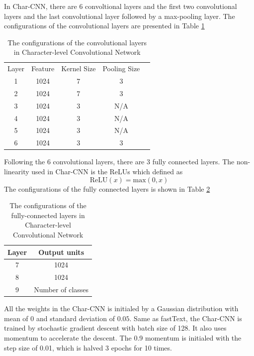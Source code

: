 In Char-CNN, there are 6 convoltional layers and the first two convolutional layers and the last convolutional layer followed by a max-pooling layer. The configurations of the convolutional layers are presented in Table \ref{config_char_cnn}

\begin{table}[]
\caption{The configurations of the convolutional layers in Character-level Convolutional Network}
\centering
\label{config_char_cnn}
\begin{tabular}{ccccc}
Layer & Feature & Kernel Size & Pooling Size &  \\ \cline{1-4}
1     & 1024    & 7           & 3            &  \\
2     & 1024    & 7           & 3            &  \\
3     & 1024    & 3           & N/A          &  \\
4     & 1024    & 3           & N/A          &  \\
5     & 1024    & 3           & N/A          &  \\
6     & 1024    & 3           & 3            & 
\end{tabular}
\end{table}

Following the 6 convolutional layers, there are 3 fully connected layers. The non-linearity used in Char-CNN is the ReLUs which defined as 
\begin{equation}
\mbox{ReLU}(x) = \mbox{max}(0,x)
\end{equation}
The configurations of the fully connected layers is shown in Table \ref{config_char_fl}
\begin{table}[]
\caption{The configurations of the fully-connected layers in Character-level Convolutional Network}
\centering
\label{config_char_fl}
\begin{tabular}{cc}
Layer & Output units      \\ \hline
7     & 1024              \\
8     & 1024              \\
9     & Number of classes
\end{tabular}
\end{table}

All the weights in the Char-CNN is initialed by a Gaussian distribution with mean of $0$ and standard deviation of $0.05$. Same as fastText, the Char-CNN is trained by stochastic gradient descent with batch size of 128. It also uses momentum to accelerate the descent. The 0.9 momentum is initialed with the step size of 0.01, which is halved 3 epochs for 10 times.

